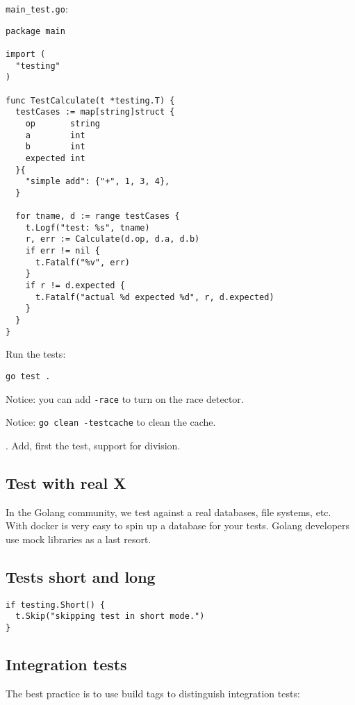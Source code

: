 \documentclass[11pt, letterpaper]{article}
\begin{document}
\verb|main_test.go|:

\begin{verbatim}
package main

import (
  "testing"
)

func TestCalculate(t *testing.T) {
  testCases := map[string]struct {
    op       string
    a        int
    b        int
    expected int
  }{
    "simple add": {"+", 1, 3, 4},
  }

  for tname, d := range testCases {
    t.Logf("test: %s", tname)
    r, err := Calculate(d.op, d.a, d.b)
    if err != nil {
      t.Fatalf("%v", err)
    }
    if r != d.expected {
      t.Fatalf("actual %d expected %d", r, d.expected)
    }
  }
}
\end{verbatim}

Run the tests:

\begin{verbatim}
go test .
\end{verbatim}

Notice: you can add \verb|-race| to turn on the race detector.

Notice: \verb|go clean -testcache| to clean the cache.

. Add, first the test, support for division.

\subsection{Test with real X}

In the Golang community, we test against a real databases, file systems, etc. With docker is very easy to spin up a database for your tests. Golang developers use mock libraries as a last resort.

\subsection{Tests short and long}

\begin{verbatim}
if testing.Short() {
  t.Skip("skipping test in short mode.")
}
\end{verbatim}

\subsection{Integration tests}

The best practice is to use build tags to distinguish integration tests:
\end{document}
